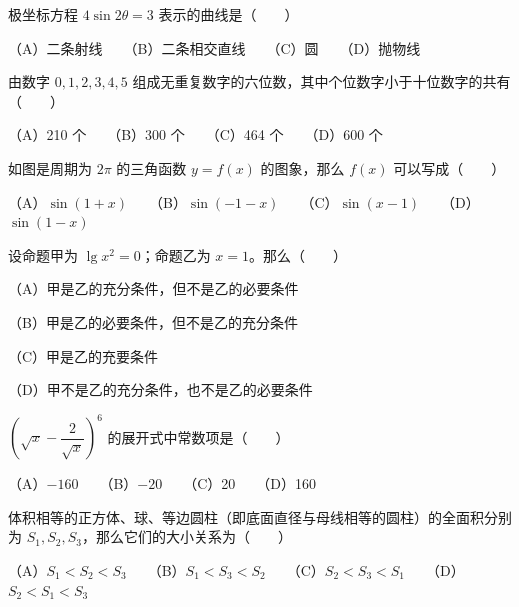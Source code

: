 \begin{question}

极坐标方程 $4\sin2\theta=3$ 表示的曲线是\mbox{（　　）}

（A）二条射线　　（B）二条相交直线　　（C）圆　　（D）抛物线

\end{question}
\begin{question}

由数字 $0,1,2,3,4,5$ 组成无重复数字的六位数，其中个位数字小于十位数字的共有\mbox{（　　）}

（A）210 个　　（B）300 个　　（C）464 个　　（D）600 个

\Needspace{0.4\textheight}
\end{question}
\begin{question}

如图是周期为 $2\pi$ 的三角函数 $y=f(x)$ 的图象，那么 $f(x)$ 可以写成\mbox{（　　）}
\nopagebreak[4]
\begin{center}\end{center}
\nopagebreak[4]
（A）$\sin(1+x)$　　（B）$\sin(-1-x)$　　（C）$\sin(x-1)$　　（D）$\sin(1-x)$

\end{question}
\begin{question}

设命题甲为 $\lg x^2=0$；命题乙为 $x=1$。那么\mbox{（　　）}

（A）甲是乙的充分条件，但不是乙的必要条件

（B）甲是乙的必要条件，但不是乙的充分条件

（C）甲是乙的充要条件

（D）甲不是乙的充分条件，也不是乙的必要条件

\end{question}
\begin{question}

$\left(\sqrt x-\dfrac2{\sqrt x}\right)^6$ 的展开式中常数项是\mbox{（　　）}

（A）$-160$　　（B）$-20$　　（C）20　　（D）160

\end{question}
\begin{question}

体积相等的正方体、球、等边圆柱（即底面直径与母线相等的圆柱）的全面积分别为 $S_1,S_2,S_3$，那么它们的大小关系为\mbox{（　　）}

（A）$S_1<S_2<S_3$　　（B）$S_1<S_3<S_2$　　（C）$S_2<S_3<S_1$　　（D）$S_2<S_1<S_3$

\end{question}
